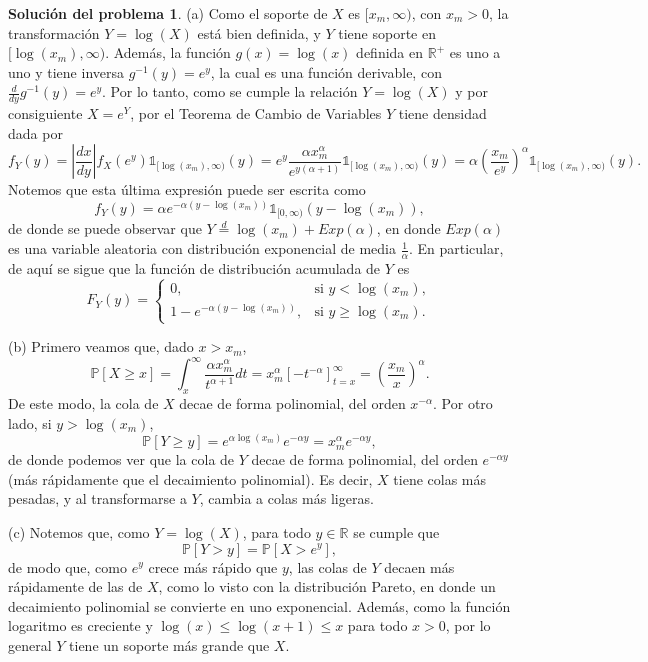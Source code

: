 \documentclass[twoside,12pt]{article}
\theoremstyle{definition}
\newtheorem{soln}{Solución del problema}
\newcommand{\RR}{\mathbb{R}}
\newcommand{\probability}[1]{\mathbb{P}\left[#1\right]}
\begin{document}
\newpage
\begin{soln}
(a) Como el soporte de $X$ es $[x_m, \infty)$, con $x_m>0$, la transformación $Y=\log(X)$ está bien definida, y $Y$ tiene soporte en $[\log(x_m), \infty)$. Además, la función $g(x)=\log(x)$ definida en $\RR^{+}$ es uno a uno y tiene inversa $g^{-1}(y)=e^y$, la cual es una función derivable, con $\frac{d}{dy}{g^{-1}}(y)=e^y$. Por lo tanto, como se cumple la relación $Y=\log(X)$ y por consiguiente $X=e^Y$, por el Teorema de Cambio de Variables $Y$ tiene densidad dada por
\[
f_Y(y) = \left\lvert \frac{dx}{dy} \right\rvert f_X(e^y) \mathds{1}_{[\log(x_m), \infty)}(y) = e^y \frac{\alpha x_m^{\alpha}}{e^{y(\alpha+1)}}\mathds{1}_{[\log(x_m), \infty)}(y) = \alpha {\left(\frac{x_m}{e^y}\right)}^\alpha \mathds{1}_{[\log(x_m), \infty)}(y).
\]
Notemos que esta última expresión puede ser escrita como
\[
f_Y(y) = \alpha e^{-\alpha \left(y-\log(x_m)\right)}\mathds{1}_{[0, \infty)}(y-\log(x_m)),
\]
de donde se puede observar que $Y \stackrel{d}{=} \log(x_m)+Exp(\alpha)$, en donde $Exp(\alpha)$ es una variable aleatoria con distribución exponencial de media $\frac{1}{\alpha}$. En particular, de aquí se sigue que la función de distribución acumulada de $Y$ es
\[
F_Y(y) = \begin{cases}
  0, & \text{si } y<\log(x_m),\\
  1-e^{-\alpha(y-\log(x_m))}, & \text{si } y\geq \log(x_m).
\end{cases}
\]

(b) Primero veamos que, dado $x>x_m$,
\[
\probability{X\geq x} = \int_{x}^{\infty} \frac{\alpha x_m^{\alpha}}{t^{\alpha+1}} dt = x_m^{\alpha} {\left[-t^{-\alpha}\right]}_{t=x}^{\infty} = {\left(\frac{x_m}{x}\right)}^{\alpha}.
\]
De este modo, la cola de $X$ decae de forma polinomial, del orden $x^{-\alpha}$. Por otro lado, si $y>\log(x_m)$,
\[
\probability{Y\geq y} = e^{\alpha \log(x_m)}e^{-\alpha y} = x_m^{\alpha} e^{-\alpha y},
\]
de donde podemos ver que la cola de $Y$ decae de forma polinomial, del orden $e^{-\alpha y}$ (más rápidamente que el decaimiento polinomial). Es decir, $X$ tiene colas más pesadas, y al transformarse a $Y$, cambia a colas más ligeras.

(c) Notemos que, como $Y=\log(X)$, para todo $y\in\RR$ se cumple que
\[
\probability{Y>y} = \probability{X>e^y},
\]
de modo que, como $e^y$ crece más rápido que $y$, las colas de $Y$ decaen más rápidamente de las de $X$, como lo visto con la distribución Pareto, en donde un decaimiento polinomial se convierte en uno exponencial. Además, como la función logaritmo es creciente y $\log(x)\leq \log(x+1)\leq x$ para todo $x>0$, por lo general $Y$ tiene un soporte más grande que $X$.


\end{soln}
\end{document}
